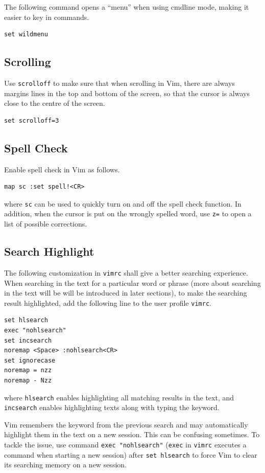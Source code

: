 The following command opens a ``menu'' when using cmdline mode, making it easier to key in commands.
\begin{lstlisting}
set wildmenu
\end{lstlisting}

\subsection{Scrolling}

Use \verb|scrolloff| to make sure that when scrolling in Vim, there are always margins lines in the top and bottom of the screen, so that the cursor is always close to the centre of the screen.
\begin{lstlisting}
set scrolloff=3
\end{lstlisting}

\subsection{Spell Check}

Enable spell check in Vim as follows.
\begin{lstlisting}
map sc :set spell!<CR>
\end{lstlisting}
where \verb|sc| can be used to quickly turn on and off the spell check function. In addition, when the cursor is put on the wrongly spelled word, use \verb|z=| to open a list of possible corrections.

\subsection{Search Highlight}

The following customization in \verb|vimrc| shall give a better searching experience. When searching in the text for a particular word or phrase (more about searching in the text will be will be introduced in later sections), to make the searching result highlighted, add the following line to the user profile \verb|vimrc|.
\begin{lstlisting}
set hlsearch
exec "nohlsearch"
set incsearch
noremap <Space> :nohlsearch<CR>
set ignorecase
noremap = nzz
noremap - Nzz
\end{lstlisting}
where \verb|hlsearch| enables highlighting all matching results in the text, and \verb|incsearch| enables highlighting texts along with typing the keyword. 

Vim remembers the keyword from the previous search and may automatically highlight them in the text on a new session. This can be confusing sometimes. To tackle the issue, use command \verb|exec "nohlsearch"| (\verb|exec| in \verb|vimrc| executes a command when starting a new session) after \verb|set hlsearch| to force Vim to clear its searching memory on a new session. 

